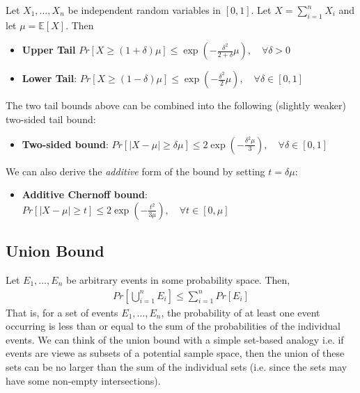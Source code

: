\documentclass[10pt,a4paper]{article}
\begin{document}
Let $X_1,\dots,X_n$ be independent random variables in $[0,1]$. Let $X = \sum_{i=1}^n X_i$ and let $\mu = \mathbb{E}[X]$. Then
\begin{itemize}
    \item \textbf{Upper Tail}
    $Pr[X \geq (1+\delta)\mu] \leq \exp\left({-\tfrac{\delta^2}{2+\delta}\mu}\right), \quad  \forall \delta > 0$
    \item \textbf{Lower Tail}:
    $Pr[X \geq (1-\delta)\mu] \leq \exp\left({-\tfrac{\delta^2}{2}\mu}\right), \quad  \forall \delta \in [0,1]$
\end{itemize}
The two tail bounds above can be combined into the following (slightly weaker) two-sided tail bound:
\begin{itemize}
    \item \textbf{Two-sided bound}: $Pr[|X-\mu| \geq \delta \mu] \leq 2 \exp\left({-\tfrac{\delta^2 \mu}{3}}\right), \quad  \forall \delta \in [0,1]$
\end{itemize}
We can also derive the \textit{additive} form of the bound by setting $t=\delta \mu$:
\begin{itemize}
    \item \textbf{Additive Chernoff bound}: 
    $Pr[|X-\mu| \geq t] \leq 2 \exp \left( {-\tfrac{t^2}{3 \mu}} \right), \quad  \forall t \in [0,\mu]$
\end{itemize}

\subsection*{Union Bound}

Let $E_1,\dots,E_n$ be arbitrary events in some probability space. Then,
\begin{align*}
    Pr \left[ \bigcup_{i=1}^n E_i \right] \leq \sum_{i=1}^n Pr[E_i]
\end{align*}
That is, for a set of events $E_1,\dots,E_n$, the probability of at least one event occurring is less than or equal to the sum of the probabilities of the individual events. We can think of the union bound with a simple set-based analogy i.e. if events are viewe as subsets of a potential sample space, then the union of these sets can be no larger than the sum of the individual sets (i.e. since the sets may have some non-empty intersections).




\end{document}
